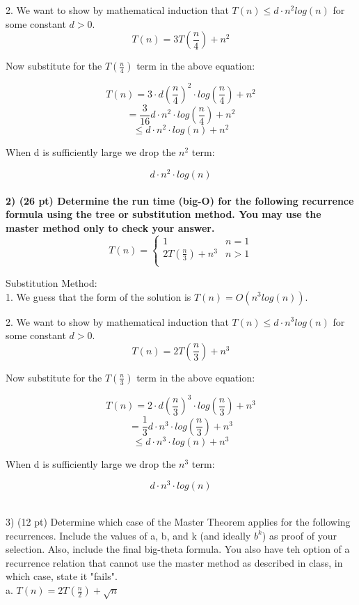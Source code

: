 \documentclass[12pt, a4paper]{article}
\begin{document}
2. We want to show by mathematical induction that $ T(n) \leq d \cdot n^2 log(n) $ for some constant $ d > 0 $. \\ 

\[
  T(n) = 3T \left(\frac{n}{4} \right) + n^2
\]
\begin{center}
  Now substitute for the $T \left(\frac{n}{4} \right)$ term in the above equation:
  \end{center}
\[
  T(n) = 3 \cdot d \left(\frac{n}{4} \right)^2 \cdot log \left(\frac{n}{4} \right) + n^2
\]
\[
  = \frac{3}{16} d \cdot n^2 \cdot log \left(\frac{n}{4} \right) + n^2
\]
\[
  \leq d \cdot n^2 \cdot log(n) + n^2
\]
\begin{center}
  When d is sufficiently large we drop the $ n^2 $ term:
\end{center}
\[
  d \cdot n^2 \cdot log(n)
\]
\\

\textbf{2) (26 pt) Determine the run time (big-O) for the following recurrence formula using the tree or substitution method.
You may use the master method only to check your answer.} \\

\[
  T(n) =  
  \begin{cases}
    1 & n = 1  \\
    2T(\frac{n}{3}) + n^3 & n > 1  \\
  \end{cases}
\]

Substitution Method: \\ 

1. We guess that the form of the solution is $ T(n) = O(n^3 log(n)) $.

2. We want to show by mathematical induction that $ T(n) \leq d \cdot n^3 log(n) $ for some constant $ d > 0 $. \\ 

\[
  T(n) = 2T \left(\frac{n}{3} \right) + n^3
\]
\begin{center}
  Now substitute for the $T \left(\frac{n}{3} \right)$ term in the above equation:
\end{center}
\[
  T(n) = 2 \cdot d \left(\frac{n}{3} \right)^3 \cdot log \left(\frac{n}{3} \right) + n^3
\]
\[
  = \frac{1}{3} d \cdot n^3 \cdot log \left(\frac{n}{3} \right) + n^3
\]
\[
  \leq d \cdot n^3 \cdot log(n) + n^3
\]
\begin{center}
  When d is sufficiently large we drop the $ n^3 $ term:
\end{center}
\[
  d \cdot n^3 \cdot log(n)
\]
\\
\newpage



3) (12 pt) Determine which case of the Master Theorem applies for the following recurrences. Include the values of
a, b, and k (and ideally $b^k$) as proof of your selection. Also, include the final big-theta formula. 
You also have teh option of a recurrence relation that cannot use the master method as described in class, 
in which case, state it "fails". \\

  a. $ T(n) = 2T (\frac{n}{2}) + \sqrt{n} $
\end{document}
